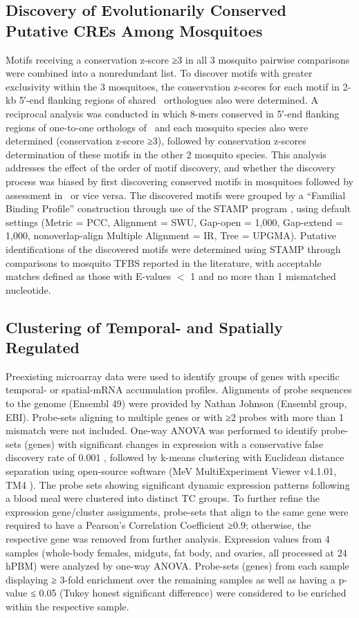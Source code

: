 \subsection{Discovery of Evolutionarily Conserved Putative CREs Among Mosquitoes}
Motifs receiving a conservation z-score ≥3 in all 3 mosquito pairwise comparisons were combined into a nonredundant list.
To discover motifs with greater exclusivity within the 3 mosquitoes, the conservation z-scores for each motif in 2-kb 5′-end flanking regions of shared \Dm\ orthologues also were determined.
A reciprocal analysis was conducted in which 8-mers conserved in 5′-end flanking regions of one-to-one orthologs of \Dm\ and each mosquito species also were determined (conservation z-score ≥3), followed by conservation z-scores determination of these motifs in the other 2 mosquito species.
This analysis addresses the effect of the order of motif discovery, and whether the discovery process was biased by first discovering conserved motifs in mosquitoes followed by assessment in \Dm\ or vice versa.
The discovered motifs were grouped by a “Familial Binding Profile” construction through use of the STAMP program \cite{Mahony2007stamp,Mahony2007dna}, using default settings (Metric = PCC, Alignment = SWU, Gap-open = 1,000, Gap-extend = 1,000, nonoverlap-align Multiple Alignment = IR, Tree = UPGMA).
Putative identifications of the discovered motifs were determined using STAMP through comparisons to mosquito TFBS reported in the literature, with acceptable matches defined as those with E-values $<$ 1 and no more than 1 mismatched nucleotide.

\subsection{Clustering of Temporal- and Spatially Regulated \Ag}
Preexisting microarray data \cite{Marinotti2005,Marinotti2006} were used to identify groups of genes with specific temporal- or spatial-mRNA accumulation profiles.
Alignments of probe sequences to the \Ag genome (Ensembl 49) were provided by Nathan Johnson (Ensembl group, EBI).
Probe-sets aligning to multiple genes or with ≥2 probes with more than 1 mismatch were not included.
One-way ANOVA was performed to identify probe-sets (genes) with significant changes in expression with a conservative false discovery rate of 0.001 \cite{Benjamini1995}, followed by k-means clustering with Euclidean distance separation using open-source software (MeV MultiExperiment Viewer v4.1.01, TM4 \cite{Saeed2003}).
The probe sets showing significant dynamic expression patterns following a blood meal were clustered into distinct TC groups.
To further refine the expression gene/cluster assignments, probe-sets that align to the same gene were required to have a Pearson's Correlation Coefficient ≥0.9; otherwise, the respective gene was removed from further analysis.
Expression values from 4 samples (whole-body females, midguts, fat body, and ovaries, all processed at 24 hPBM) were analyzed by one-way ANOVA.
Probe-sets (genes) from each sample displaying ≥ 3-fold enrichment over the remaining samples as well as having a p-value ≤ 0.05 (Tukey honest significant difference) were considered to be enriched within the respective sample.

